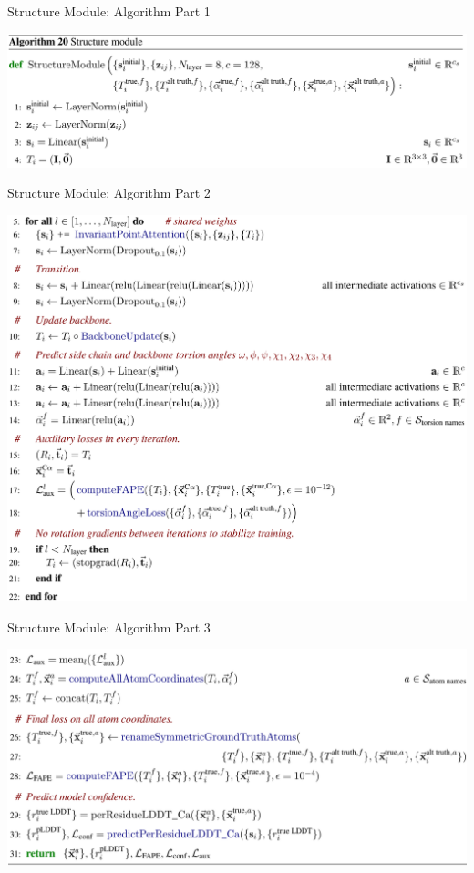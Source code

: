 \documentclass[presentation, smaller]{beamer}
\begin{document}
\begin{frame}[label={sec:org2e83edb}]{Structure Module: Algorithm Part 1 \cite{jumperHighlyAccurateProtein2021}}
\begin{center}
\includegraphics[width=.9\linewidth]{./imgs/algo20-part1.png}
\end{center}
\end{frame}

\begin{frame}[label={sec:orgb2d0717}]{Structure Module: Algorithm Part 2 \cite{jumperHighlyAccurateProtein2021}}
\begin{center}
\includegraphics[width=.9\linewidth]{./imgs/algo20-part2.png}
\end{center}
\end{frame}

\begin{frame}[label={sec:orgf5bfc43}]{Structure Module: Algorithm Part 3 \cite{jumperHighlyAccurateProtein2021}}
\begin{center}
\includegraphics[width=.9\linewidth]{./imgs/algo20-part3.png}
\end{center}
\end{frame}
\end{document}
